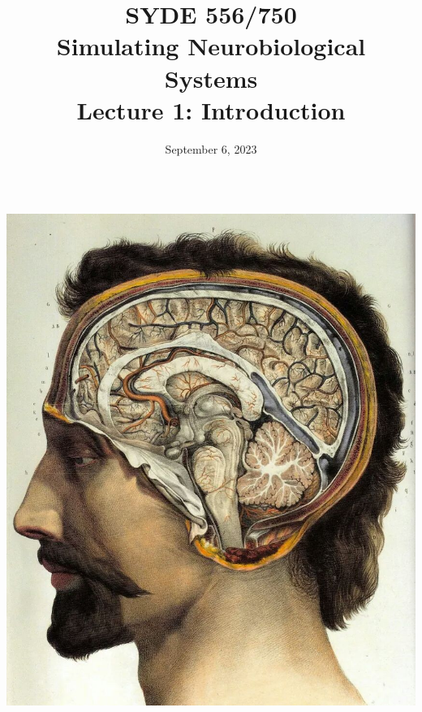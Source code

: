 \documentclass[handout,aspectratio=169]{beamer}
\date{September 6, 2023}
\title{SYDE 556/750 \\ Simulating Neurobiological Systems \\ Lecture 1: Introduction}
\begin{document}
	
\begin{frame}{}
	\vspace{0.5cm}
	\begin{columns}[c]
		\MakeTitle
		\includegraphics[width=\textwidth]{media/jean_baptiste_marc_bourgery_atlas_of_anatomy_human_brain.jpg}
	\end{columns}
\end{frame}
\end{document}
